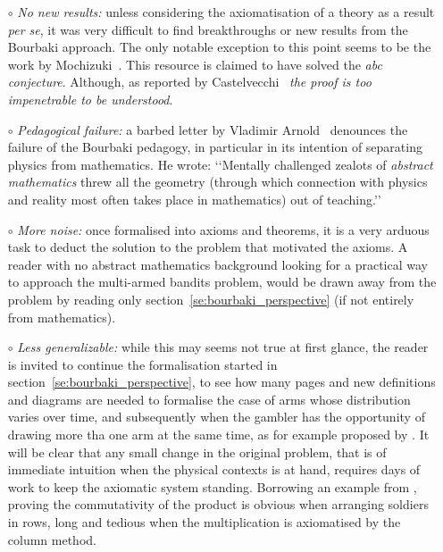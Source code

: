 \documentclass[]{scrartcl}
\theoremstyle{definition}
\begin{document}
\begin{itemize}

    \item[$\circ$] \emph{No new results:} unless considering the axiomatisation of a theory as a result \emph{per se}, it was very difficult to find breakthroughs or new results from the Bourbaki approach. The only notable exception to this point seems to be the work by Mochizuki~\cite{mochizuki2012inter}. This resource is claimed to have solved the \emph{abc conjecture}. Although, as reported by Castelvecchi~\cite{castelvecchi2015biggest} \emph{the proof is too impenetrable to be understood}.
     
    \item[$\circ$] \emph{Pedagogical failure:} a barbed letter by Vladimir Arnold~\cite{arnol1998teaching} denounces the failure of the Bourbaki pedagogy, in particular in its intention of separating physics from mathematics. He wrote: \lq\lq Mentally challenged zealots of \emph{abstract mathematics} threw all the geometry (through which connection with physics and reality most often takes place in mathematics) out of teaching.\rq\rq
    
    \item[$\circ$] \emph{More noise:} once formalised into axioms and theorems, it is a very arduous task to deduct the solution to the problem that motivated the axioms. A reader with no abstract mathematics background looking for a practical way to approach the multi-armed bandits problem, would be drawn away from the problem by reading only section~\ref{se:bourbaki_perspective} (if not entirely from mathematics).
     
    \item[$\circ$] \emph{Less generalizable:} while this may seems not true at first glance, the reader is invited to continue the formalisation started in section~\ref{se:bourbaki_perspective}, to see how many pages and new definitions and diagrams are needed to formalise the case of arms whose distribution varies over time, and subsequently when the gambler has the opportunity of drawing more tha one arm at the same time, as for example proposed by \cite{trovo2018improving}. It will be clear that any small change in the original problem, that is of immediate intuition when the physical contexts is at hand, requires days of work to keep the axiomatic system standing. Borrowing an example from \cite{arnol1998teaching}, proving the commutativity of the product is obvious when arranging soldiers in rows, long and tedious when the multiplication is axiomatised by the column method.
    

\end{itemize}
\end{document}
